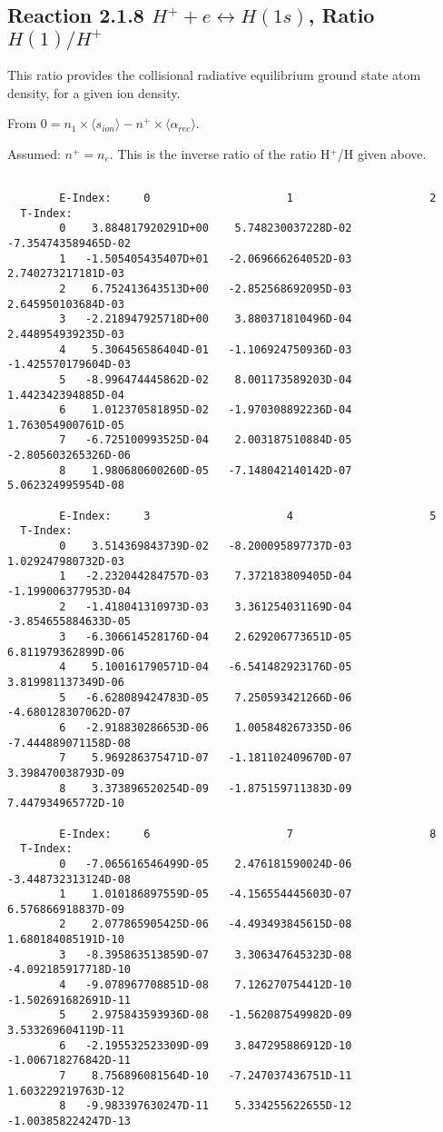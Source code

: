 \documentclass[12pt,dvipdfmx]{article}
\begin{document}
{\subsection{
Reaction 2.1.8   $H^+ + e \leftrightarrow H(1s) $,  Ratio $H(1)/H^+$
}
This ratio provides the collisional radiative equilibrium ground state
atom density, for a given ion density.

From $0 = n_1 \times  \langle s_{ion} \rangle - n^+ \times \langle\alpha_{rec} \rangle$.

Assumed:  $n^+ = n_e$. This is the inverse ratio of the ratio H$^+$/H given
above.
\begin{small}\begin{verbatim}

        E-Index:     0                     1                     2
  T-Index:
        0    3.884817920291D+00    5.748230037228D-02   -7.354743589465D-02
        1   -1.505405435407D+01   -2.069666264052D-03    2.740273217181D-03
        2    6.752413643513D+00   -2.852568692095D-03    2.645950103684D-03
        3   -2.218947925718D+00    3.880371810496D-04    2.448954939235D-03
        4    5.306456586404D-01   -1.106924750936D-03   -1.425570179604D-03
        5   -8.996474445862D-02    8.001173589203D-04    1.442342394885D-04
        6    1.012370581895D-02   -1.970308892236D-04    1.763054900761D-05
        7   -6.725100993525D-04    2.003187510884D-05   -2.805603265326D-06
        8    1.980680600260D-05   -7.148042140142D-07    5.062324995954D-08

        E-Index:     3                     4                     5
  T-Index:
        0    3.514369843739D-02   -8.200095897737D-03    1.029247980732D-03
        1   -2.232044284757D-03    7.372183809405D-04   -1.199006377953D-04
        2   -1.418041310973D-03    3.361254031169D-04   -3.854655884633D-05
        3   -6.306614528176D-04    2.629206773651D-05    6.811979362899D-06
        4    5.100161790571D-04   -6.541482923176D-05    3.819981137349D-06
        5   -6.628089424783D-05    7.250593421266D-06   -4.680128307062D-07
        6   -2.918830286653D-06    1.005848267335D-06   -7.444889071158D-08
        7    5.969286375471D-07   -1.181102409670D-07    3.398470038793D-09
        8    3.373896520254D-09   -1.875159711383D-09    7.447934965772D-10

        E-Index:     6                     7                     8
  T-Index:
        0   -7.065616546499D-05    2.476181590024D-06   -3.448732313124D-08
        1    1.010186897559D-05   -4.156554445603D-07    6.576866918837D-09
        2    2.077865905425D-06   -4.493493845615D-08    1.680184085191D-10
        3   -8.395863513859D-07    3.306347645323D-08   -4.092185917718D-10
        4   -9.078967708851D-08    7.126270754412D-10   -1.502691682691D-11
        5    2.975843593936D-08   -1.562087549982D-09    3.533269604119D-11
        6   -2.195532523309D-09    3.847295886912D-10   -1.006718276842D-11
        7    8.756896081564D-10   -7.247037436751D-11    1.603229219763D-12
        8   -9.983397630247D-11    5.334255622655D-12   -1.003858224247D-13


\end{verbatim}
\end{small}}
\end{document}
